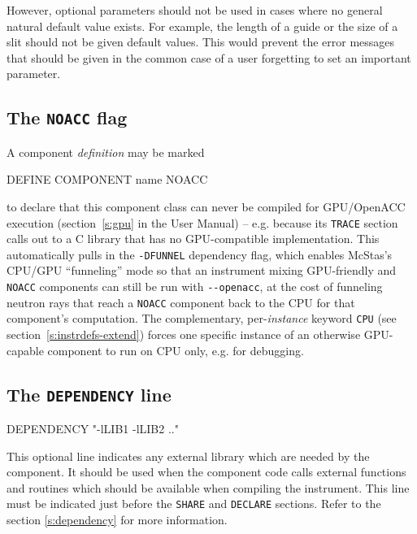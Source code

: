   However, optional parameters should not be used in cases where no general
  natural default value exists. For example, the length of a guide or the size
  of a slit should not be given default values. This would prevent the error
  messages that should be given in the common case of a user forgetting to set
  an important parameter.

\subsection{The \texttt{NOACC} flag}
\label{s:noacc}

A component \emph{definition} may be marked
\begin{mcstas}
DEFINE COMPONENT name NOACC
\end{mcstas}
to declare that this component class can never be compiled for GPU/OpenACC
execution (section~\ref{s:gpu} in the User Manual) -- e.g. because its
\texttt{TRACE} section calls out to a C library that has no GPU-compatible
implementation. This automatically pulls in the \texttt{-DFUNNEL} dependency
flag, which enables McStas's CPU/GPU ``funneling'' mode so that an
instrument mixing GPU-friendly and \texttt{NOACC} components can still be
run with \verb+--openacc+, at the cost of funneling neutron rays that reach
a \texttt{NOACC} component back to the CPU for that component's computation.
The complementary, per-\emph{instance} keyword \texttt{CPU} (see
section~\ref{s:instrdefs-extend}) forces one specific instance of an
otherwise GPU-capable component to run on CPU only, e.g. for debugging.

\subsection{The \texttt{DEPENDENCY} line}
\label{s:comp-dependency}
\begin{mcstas}
DEPENDENCY "-lLIB1 -lLIB2 .."
\end{mcstas}
This optional line indicates any external library which are needed by the component.
It should be used when the component code calls external functions and routines
which should be available when compiling the instrument. 
This line must be indicated just before the \texttt{SHARE} and \texttt{DECLARE} sections.
Refer to the section \ref{s:dependency} for more information.

